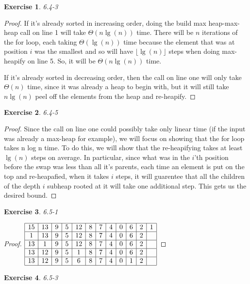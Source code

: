 \documentclass{article}
\newtheorem{th1}{Exercise}
\begin{document}
\begin{th1}\label{ex11}
6.4-3
\end{th1}
\begin{proof}
If it's already sorted in increasing order, doing the build max heap-max-heap call on line 1 will take $\Theta(n\lg(n))$ time. There will be $n$ iterations of the for loop, each taking $\Theta(\lg(n))$ time because the element that was at position $i$ was the smallest and so will have $\lfloor \lg(n)\rfloor$ steps when doing max-heapify on line 5. So, it will be $\Theta(n\lg(n))$ time.

If it's already sorted in decreasing order, then the call on line one will only take $\Theta(n)$ time, since it was already a heap to begin with, but it will still take $n\lg(n)$ peel off the elements from the heap and re-heapify. 
\end{proof}
\begin{th1}\label{ex12}
6.4-5
\end{th1}
\begin{proof}
Since the call on line one could possibly take only linear time (if the input was already a max-heap for example), we will focus on showing that the for loop takes n log n time. To do this, we will show that the re-heapifying takes at least $\lg(n)$ steps on average. In particular, since what was in the $i$'th position before the swap was less than all it's parents, each time an element is put on the top and re-heapafied, when it takes $i$  steps, it will guarentee that all the children of the depth $i$ subheap rooted at it will take one additional step. This gets us the desired bound.
\end{proof}
\begin{th1}\label{ex13}
6.5-1
\end{th1}
\begin{proof}
$
\begin{array}{|c|c|c|c|c|c|c|c|c|c|c|c|}
\hline
15&13&9&5&12&8&7&4&0&6&2&1\\
\hline
1&13&9&5&12&8&7&4&0&6&2&\\
\hline
13&1&9&5&12&8&7&4&0&6&2&\\
\hline
13&12&9&5&1&8&7&4&0&6&2&\\
\hline
13&12&9&5&6&8&7&4&0&1&2&\\
\hline
\end{array}
$
\end{proof}
\begin{th1}\label{ex14}
6.5-3
\end{th1}
\end{document}
